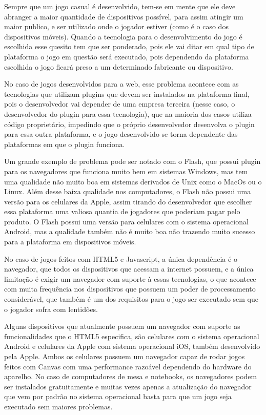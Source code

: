 Sempre que um jogo casual é desenvolvido, tem-se em mente que ele deve
abranger a maior quantidade de dispositivos possível, para assim
atingir um maior publico, e ser utilizado onde o jogador estiver (como
é o caso dos dispositivos móveis). Quando a tecnologia para o
desenvolvimento do jogo é escolhida esse quesito tem que ser
ponderado, pois ele vai ditar em qual tipo de plataforma o jogo em
questão será executado, pois dependendo da plataforma escolhida o jogo ficará preso
a um determinado fabricante ou dispositivo.

No caso de jogos desenvolvidos para a web, esse problema acontece com as
tecnologias que utilizam plugins que devem ser instalados na
plataforma final, pois o desenvolvedor vai depender de uma empresa
terceira (nesse caso, o desenvolvedor do plugin para essa tecnologia),
que na maioria dos casos utiliza código proprietário, impedindo que o
próprio desenvolvedor desenvolva o plugin para essa outra plataforma,
e o jogo desenvolvido se torna dependente das plataformas em que o plugin
funciona.

Um grande exemplo de problema pode ser notado com o Flash, que possui
plugin para os navegadores que funciona muito bem em sistemas Windows,
mas tem uma qualidade não muito boa em sistemas derivados de Unix como
o MacOs ou o Linux. Além desse baixa qualidade nos computadores, o
Flash não possui uma versão para os celulares da Apple, assim tirando
do desenvolvedor que escolher essa plataforma uma valiosa quantia de
jogadores que poderiam pagar pelo produto. O Flash possui uma versão
para celulares com o sistema operacional Android, mas a qualidade
também não é muito boa não trazendo muito sucesso para a plataforma em
dispositivos móveis.

No caso de jogos feitos com HTML5 e Javascript, a única dependência é
o navegador, que todos os dispositivos que acessam a internet possuem,
e a única limitação é exigir um navegador com suporte à essas
tecnologias, o que acontece com muita frequência nos dispositivos que
possuem um poder de processamento considerável, que também é um dos
requisitos para o jogo ser executado sem que o jogador sofra com
lentidões.

Alguns dispositivos que atualmente possuem um navegador com suporte as
funcionalidades que o HTML5 especifica, são celulares com o sistema
operacional Android e celulares da Apple com sistema operacional iOS,
também desenvolvido pela Apple.
Ambos os celulares possuem um navegador capaz de rodar jogos feitos
com Canvas com uma performance razoável dependendo do hardware do
aparelho. No caso de computadores de mesa e notebooks, os navegadores
podem ser instalados gratuitamente e muitas vezes apenas a atualização
do navegador que vem por padrão no sistema operacional basta para que
um jogo seja executado sem maiores problemas.

